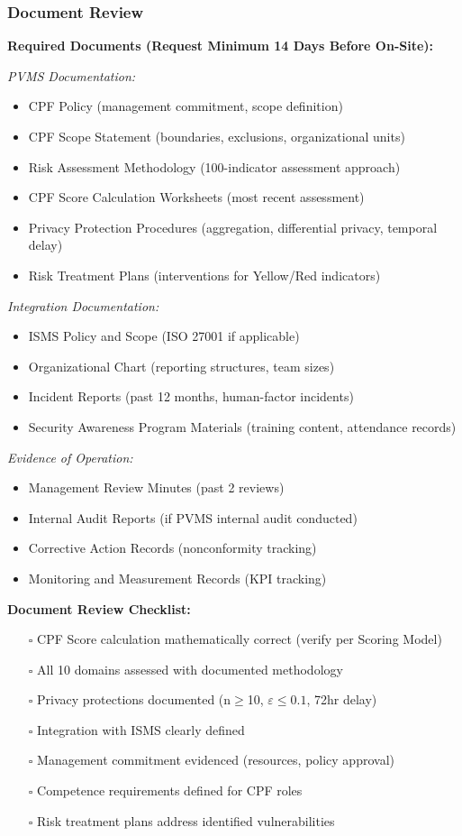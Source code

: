 \documentclass[11pt,a4paper]{article}
\begin{document}
\subsubsection{Document Review}

\textbf{Required Documents (Request Minimum 14 Days Before On-Site):}

\textit{PVMS Documentation:}
\begin{itemize}
\item CPF Policy (management commitment, scope definition)
\item CPF Scope Statement (boundaries, exclusions, organizational units)
\item Risk Assessment Methodology (100-indicator assessment approach)
\item CPF Score Calculation Worksheets (most recent assessment)
\item Privacy Protection Procedures (aggregation, differential privacy, temporal delay)
\item Risk Treatment Plans (interventions for Yellow/Red indicators)
\end{itemize}

\textit{Integration Documentation:}
\begin{itemize}
\item ISMS Policy and Scope (ISO 27001 if applicable)
\item Organizational Chart (reporting structures, team sizes)
\item Incident Reports (past 12 months, human-factor incidents)
\item Security Awareness Program Materials (training content, attendance records)
\end{itemize}

\textit{Evidence of Operation:}
\begin{itemize}
\item Management Review Minutes (past 2 reviews)
\item Internal Audit Reports (if PVMS internal audit conducted)
\item Corrective Action Records (nonconformity tracking)
\item Monitoring and Measurement Records (KPI tracking)
\end{itemize}

\textbf{Document Review Checklist:}

\begin{itemize}
\item[$\square$] CPF Score calculation mathematically correct (verify per Scoring Model)
\item[$\square$] All 10 domains assessed with documented methodology
\item[$\square$] Privacy protections documented (n$\geq$10, $\varepsilon \leq 0.1$, 72hr delay)
\item[$\square$] Integration with ISMS clearly defined
\item[$\square$] Management commitment evidenced (resources, policy approval)
\item[$\square$] Competence requirements defined for CPF roles
\item[$\square$] Risk treatment plans address identified vulnerabilities
\end{itemize}
\end{document}
